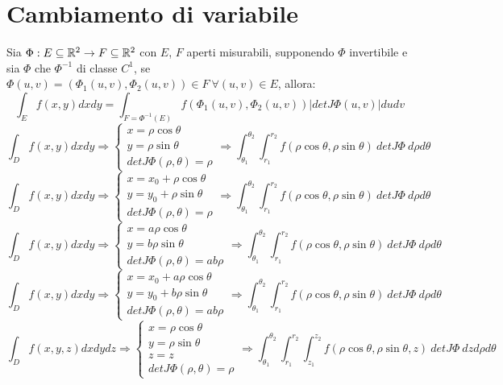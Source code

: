 	\section{Cambiamento di variabile}
	Sia $\Phi:E \subseteq \mathbb{R}^2 \rightarrow F \subseteq \mathbb{R}^2$ con $E$, $F$ aperti misurabili, supponendo $\Phi$ invertibile e sia $\Phi$ che $\Phi^{-1}$ di classe $C^1$, se $\Phi(u,v)=\left(\Phi_1(u,v),\Phi_2(u,v)\right)\in F \ \forall (u,v)\in E$, allora:
	$$\int_E f(x,y) dxdy=\int_{F=\Phi^{-1}(E)}f\left(\Phi_1(u,v),\Phi_2(u,v)\right)|detJ\Phi(u,v)|dudv$$
	$$\int_D f(x,y)dxdy \Rightarrow \begin{cases} x = \rho \cos \theta \\ y = \rho \sin \theta \\ detJ\Phi(\rho,\theta)=\rho \end{cases} \Rightarrow \int_{\theta_1}^{\theta_2}\int_{r_1}^{r_2}f(\rho \cos\theta, \rho \sin \theta)\ detJ\Phi\  d\rho d\theta$$
	$$\int_D f(x,y)dxdy \Rightarrow \begin{cases} x = x_0 + \rho \cos \theta \\ y =y_0 + \rho \sin \theta \\ detJ\Phi(\rho,\theta)=\rho \end{cases} \Rightarrow \int_{\theta_1}^{\theta_2}\int_{r_1}^{r_2}f(\rho \cos\theta, \rho \sin \theta)\ detJ\Phi\  d\rho d\theta$$
	$$\int_D f(x,y)dxdy \Rightarrow \begin{cases} x = a \rho \cos \theta \\ y = b \rho \sin \theta \\ detJ\Phi(\rho,\theta)=ab\rho \end{cases} \Rightarrow \int_{\theta_1}^{\theta_2}\int_{r_1}^{r_2}f(\rho \cos\theta, \rho \sin \theta)\ detJ\Phi\  d\rho d\theta$$
	$$\int_D f(x,y)dxdy \Rightarrow \begin{cases} x = x_0 + a \rho \cos \theta \\ y = y_0 + b \rho \sin \theta \\ detJ\Phi(\rho,\theta)=ab\rho \end{cases} \Rightarrow \int_{\theta_1}^{\theta_2}\int_{r_1}^{r_2}f(\rho \cos\theta, \rho \sin \theta)\ detJ\Phi\  d\rho d\theta$$
	$$\int_D f(x,y,z)dxdydz \Rightarrow \begin{cases} x = \rho \cos \theta \\ y = \rho \sin \theta \\z=z\\ detJ\Phi(\rho,\theta)=\rho \end{cases} \Rightarrow \int_{\theta_1}^{\theta_2}\int_{r_1}^{r_2}\int_{z_1}^{z_2}f(\rho \cos\theta, \rho \sin \theta, z)\ detJ\Phi\  dzd\rho d\theta$$
